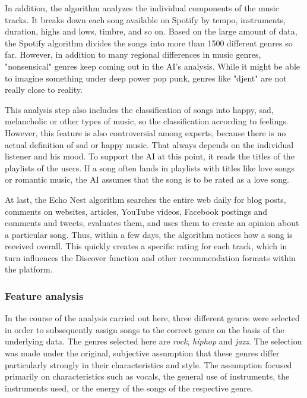 In addition, the algorithm analyzes the individual components of the music tracks. 
It breaks down each song available on Spotify by tempo, instruments, duration, highs and lows,
timbre, and so on. 
Based on the large amount of data, the Spotify algorithm divides the songs into more than 1500
different genres so far. 
However, in addition to many regional differences in music genres, "nonsensical" genres keep
coming out in the AI's analysis. While it might be able to imagine something under deep power pop punk,
genres like "djent" are not really close to reality. \cite[]{Boyd2019}

This analysis step also includes the classification of songs into happy, sad,
melancholic or other types of music, so the classification according to feelings.
However, this feature is also controversial among experts, because there is no actual definition of sad or happy music. 
That always depends on the individual listener and his mood. To support the AI at this point,
it reads the titles of the playlists of the users. 
If a song often lands in playlists with titles like love songs or romantic music,
the AI assumes that the song is to be rated as a love song. \cite[]{Boyd2019}

At last, the Echo Nest algorithm searches the entire web daily for blog posts, comments on websites,
articles, YouTube videos, Facebook postings and comments and tweets, 
evaluates them, and uses them to create an opinion about a particular song.
Thus, within a few days, the algorithm notices how a song is received overall.  
This quickly creates a specific rating for each track, which in turn influences the
Discover function and other recommendation formats within the platform. \cite[]{Boyd2019}

\subsubsection{Feature analysis}
In the course of the analysis carried out here, three different genres were selected in order
to subsequently assign songs to the correct genre on the basis of the underlying data. 
The genres selected here are \emph{rock}, \emph{hiphop} and \emph{jazz}. The selection was made under the original, 
subjective assumption that these genres differ particularly strongly in their characteristics and style. 
The assumption focused primarily on characteristics such as vocals, the general use of instruments,
the instruments used, or the energy of the songs of the respective genre.

